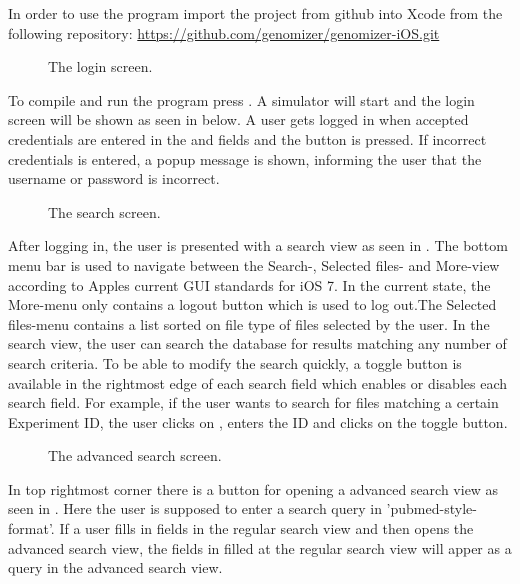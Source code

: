 In order to use the program import the project from github into Xcode from the following repository:
\url{https://github.com/genomizer/genomizer-iOS.git} 

\begin{figure}[ht]
\caption{The login screen.}
\label{fig:ios_login}
\end{figure}
\FloatBarrier

To compile and run the program press . A simulator will start and the login screen will be shown as seen in   below. A user gets logged in when accepted credentials are entered in the  and  fields and the  button is pressed. If incorrect credentials is entered, a popup message is shown, informing the user that the username or password is incorrect.

\begin{figure}[ht]
\caption{The search screen.}
\label{fig:ios_search}
\end{figure}
\FloatBarrier


After logging in, the user is presented with a search view as seen in . The bottom menu bar is used to navigate between the Search-, Selected files- and More-view according to Apples current GUI standards for iOS 7. In the current state, the More-menu only contains a logout button which is used to log out.The Selected files-menu contains a list sorted on file type of files selected by the user. In the search view, the user can search the database for results matching any number of search criteria. To be able to modify the search quickly, a toggle button is available in the rightmost edge of each search field which enables or disables each search field. For example, if the user wants to search for files matching a certain Experiment ID, the user clicks on , enters the ID and clicks on the toggle button. 


\begin{figure}[ht]
\caption{The advanced search screen.}
\label{fig:ios_advSearch}
\end{figure}
\FloatBarrier

In top rightmost corner there is a button for opening a advanced search view as seen in . Here the user is supposed to enter a search query in ’pubmed-style-format’. If a user fills in fields in the regular search view and then opens the advanced search view, the fields in filled at the regular search view will apper as a query in the advanced search view.

